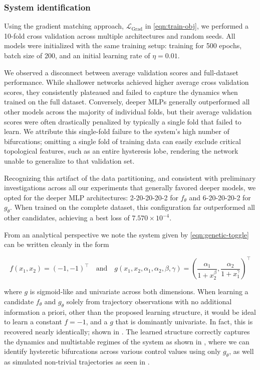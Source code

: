 \documentclass[11pt,twoside]{article}
\theoremstyle{plain}
\theoremstyle{definition}
\theoremstyle{remark}
\begin{document}
\subsubsection*{System identification}
Using the gradient matching approach, \(\mathcal{L}_{\text{Grad}}\) in \cref{eqn:train-obj}, we performed a 10-fold cross validation across multiple architectures and random seeds. All models were initialized with the same training setup: training for 500 epochs, batch size of 200, and an initial learning rate of \(\eta = 0.01\).

We observed a disconnect between average validation scores and full-dataset performance. While shallower networks achieved higher average cross validation scores, they consistently plateaued and failed to capture the dynamics when trained on the full dataset. Conversely, deeper MLPs generally outperformed all other models across the majority of individual folds, but their average validation scores were often drastically penalized by typically a single fold that failed to learn. We attribute this single-fold failure to the system's high number of bifurcations; omitting a single fold of training data can easily exclude critical topological features, such as an entire hysteresis lobe, rendering the network unable to generalize to that validation set.

Recognizing this artifact of the data partitioning, and consistent with preliminary investigations across all our experiments that generally favored deeper models, we opted for the deeper MLP architectures: 2-20-20-20-2 for \(f_\theta\) and 6-20-20-20-2 for \(g_\theta\). When trained on the complete dataset, this configuration far outperformed all other candidates, achieving a best loss of \(7.570\times 10^{-4}\).

From an analytical perspective we note the system given by \cref{eqn:genetic-toggle} can be written cleanly in the form  

\begin{equation*}
    f(x_1, x_2) = (-1,-1)^\top \quad \text{and} \quad g(x_1, x_2, \alpha_1, \alpha_2, \beta,\gamma) = \left(\frac{\alpha_1}{1+x_2^\beta}, \frac{\alpha_2}{1+x_1^\gamma}\right)^\top
\end{equation*}

where \(g\) is sigmoid-like and univariate across both dimensions. When learning a candidate \(f_\theta\) and \(g_\theta\) solely from trajectory observations with no additional information a priori, other than the proposed learning structure, it would be ideal to learn a  constant \(f=-1\), and a \(g\) that is dominantly univariate. In fact, this is recovered nearly identically; shown in . The learned structure correctly captures the dynamics and multistable regimes of the system as shown in , where we can identify hysteretic bifurcations across various control values using only \(g_\theta\), as well as simulated non-trivial trajectories as seen in .
\end{document}
